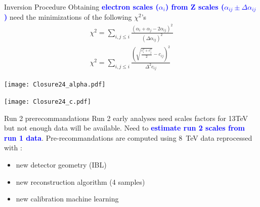 
\begin{frame}{Inversion Procedure}
Obtaining \textcolor{blue}{\bf electron scales ($\alpha_i$) from Z scales ($\alpha_{ij} \pm \Delta\alpha_{ij}$)} need the minimizations of the following $\chi^2$'s
\begin{equation}
\begin{array}{l}
\chi^2 = \sum \limits_{i, j\leq i} \frac{ (\alpha_i + \alpha_j - 2\alpha_{ij})^2 }{(\Delta\alpha_{ij})^2}\\
\chi^2 = \sum \limits_{i, j\leq i} \frac{ (\sqrt{\frac{c_i^2 + c_j^2}{2}} - c_{ij})^2 }{\Delta^2 c_{ij}}
\end{array}
\end{equation}
\begin{center}
\begin{minipage}{0.40\linewidth}
    \texttt{[image: Closure24\_alpha.pdf]}
\end{minipage}
\begin{minipage}{0.40\linewidth}
    \texttt{[image: Closure24\_c.pdf]}
\end{minipage}
\end{center}
\end{frame}

\begin{frame}{Run 2 prerecommandations}
  Run 2 early analyses need scales factors for 13TeV but not enough data will be available.
  Need to \textcolor{blue}{ \bf estimate run 2 scales from run 1 data}.
  \newline
  Pre-recommandations are computed using $8$~TeV data reprocessed with :
  \begin{itemize}
  \item new detector geometry (IBL)
  \item new reconstruction algorithm (4 samples)
  \item new calibration machine learning
  \end{itemize} 
  \begin{minipage}{0.49\linewidth}
  \end{minipage}
  \begin{minipage}{0.49\linewidth}
    \centering
  \end{minipage}
\end{frame}

